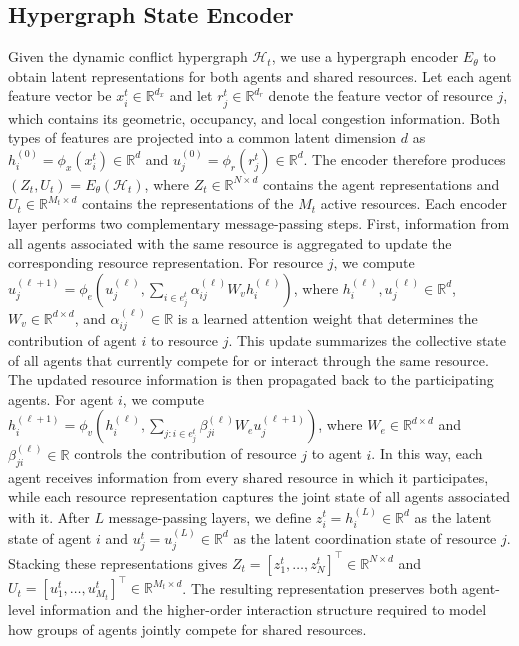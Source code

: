 \documentclass{article} %
\begin{document}
\subsection{Hypergraph State Encoder} \label{sec:encoder} Given the dynamic conflict hypergraph $\mathcal{H}_t$, we use a hypergraph encoder $E_\theta$ to obtain latent representations for both agents and shared resources. Let each agent feature vector be $x_i^t\in\mathbb{R}^{d_x}$ and let $r_j^t\in\mathbb{R}^{d_r}$ denote the feature vector of resource $j$, which contains its geometric, occupancy, and local congestion information. Both types of features are projected into a common latent dimension $d$ as $h_i^{(0)}=\phi_x(x_i^t)\in\mathbb{R}^{d}$ and $u_j^{(0)}=\phi_r(r_j^t)\in\mathbb{R}^{d}$. The encoder therefore produces $(Z_t,U_t)=E_\theta(\mathcal{H}_t)$, where $Z_t\in\mathbb{R}^{N\times d}$ contains the agent representations and $U_t\in\mathbb{R}^{M_t\times d}$ contains the representations of the $M_t$ active resources. Each encoder layer performs two complementary message-passing steps. First, information from all agents associated with the same resource is aggregated to update the corresponding resource representation. For resource $j$, we compute $u_j^{(\ell+1)}=\phi_e\!\left(u_j^{(\ell)},\sum_{i\in e_j^t}\alpha_{ij}^{(\ell)}W_v h_i^{(\ell)}\right)$, where $h_i^{(\ell)},u_j^{(\ell)}\in\mathbb{R}^{d}$, $W_v\in\mathbb{R}^{d\times d}$, and $\alpha_{ij}^{(\ell)}\in\mathbb{R}$ is a learned attention weight that determines the contribution of agent $i$ to resource $j$. This update summarizes the collective state of all agents that currently compete for or interact through the same resource. The updated resource information is then propagated back to the participating agents. For agent $i$, we compute $h_i^{(\ell+1)}=\phi_v\!\left(h_i^{(\ell)},\sum_{j:i\in e_j^t}\beta_{ji}^{(\ell)}W_e u_j^{(\ell+1)}\right)$, where $W_e\in\mathbb{R}^{d\times d}$ and $\beta_{ji}^{(\ell)}\in\mathbb{R}$ controls the contribution of resource $j$ to agent $i$. In this way, each agent receives information from every shared resource in which it participates, while each resource representation captures the joint state of all agents associated with it. After $L$ message-passing layers, we define $z_i^t=h_i^{(L)}\in\mathbb{R}^{d}$ as the latent state of agent $i$ and $u_j^t=u_j^{(L)}\in\mathbb{R}^{d}$ as the latent coordination state of resource $j$. Stacking these representations gives $Z_t=[z_1^t,\ldots,z_N^t]^\top\in\mathbb{R}^{N\times d}$ and $U_t=[u_1^t,\ldots,u_{M_t}^t]^\top\in\mathbb{R}^{M_t\times d}$. The resulting representation preserves both agent-level information and the higher-order interaction structure required to model how groups of agents jointly compete for shared resources.
\end{document}
